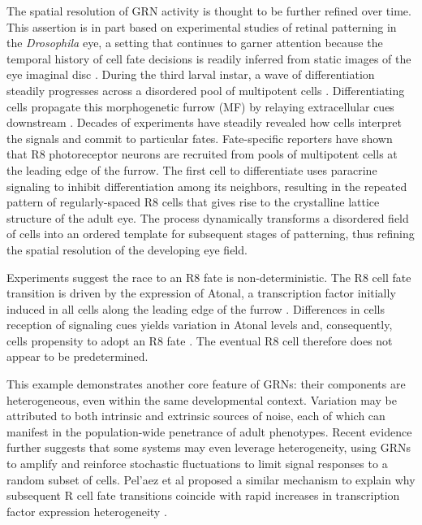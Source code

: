 The spatial resolution of GRN activity is thought to be further refined over time. This assertion is in part based on experimental studies of retinal patterning in the \textit{Drosophila} eye, a setting that continues to garner attention because the temporal history of cell fate decisions is readily inferred from static images of the eye imaginal disc \cite{Pelaez2015}. During the third larval instar, a wave of differentiation steadily progresses across a disordered pool of multipotent cells \cite{Ready1976,Tomlinson1987}. Differentiating cells propagate this morphogenetic furrow (MF) by relaying extracellular cues downstream \cite{Lubensky2011}. Decades of experiments have steadily revealed how cells interpret the signals and commit to particular fates. Fate-specific reporters have shown that R8 photoreceptor neurons are recruited from pools of multipotent cells at the leading edge of the furrow. The first cell to differentiate uses paracrine signaling to inhibit differentiation among its neighbors, resulting in the repeated pattern of regularly-spaced R8 cells that gives rise to the crystalline lattice structure of the adult eye. The process dynamically transforms a disordered field of cells into an ordered template for subsequent stages of patterning, thus refining the spatial resolution of the developing eye field.

Experiments suggest the race to an R8 fate is non-deterministic. The R8 cell fate transition is driven by the expression of Atonal, a transcription factor initially induced in all cells along the leading edge of the furrow \cite{Jarman1994,Baker1997,Hsiung2002}. Differences in cells reception of signaling cues yields variation in Atonal levels and, consequently, cells propensity to adopt an R8 fate \cite{Baker1990,Gavish2016}. The eventual R8 cell therefore does not appear to be predetermined.

This example demonstrates another core feature of GRNs: their components are heterogeneous, even within the same developmental context. Variation may be attributed to both intrinsic and extrinsic sources of noise, each of which can manifest in the population-wide penetrance of adult phenotypes. Recent evidence further suggests that some systems may even leverage heterogeneity, using GRNs to amplify and reinforce stochastic fluctuations to limit signal responses to a random subset of cells. Pel'{a}ez et al proposed a similar mechanism to explain why subsequent R cell fate transitions coincide with rapid increases in transcription factor expression heterogeneity \cite{Pelaez2015}.

